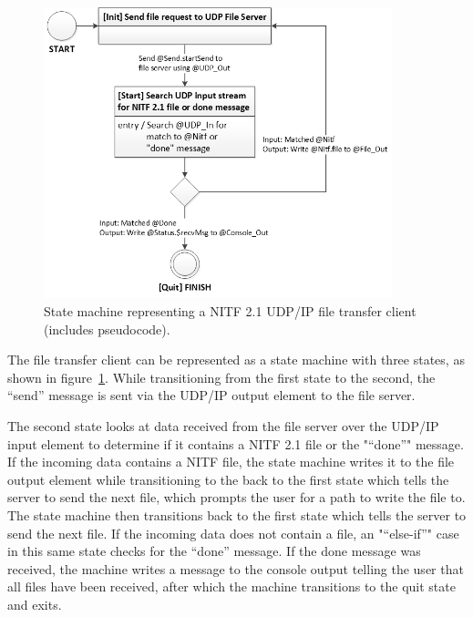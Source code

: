 \begin{figure}[htbp]
\centering
\includegraphics[width=0.9\textwidth]{figures/NitfFileClientUmlStateMachine.png}
\caption[State machine representing a NITF 2.1 UDP/IP file transfer client]{State machine representing a NITF 2.1 UDP/IP file transfer client (includes pseudocode).}
\label{fig:NitfFileClientUmlStateMachine}
\end{figure}

\indent
The file transfer client can be represented as a state machine with three states, as shown in figure~\ref{fig:NitfFileClientUmlStateMachine}.  While transitioning from the first state to the second, the “send” message is sent via the UDP/IP output element to the file server.

\indent
The second state looks at data received from the file server over the UDP/IP input element to determine if it contains a NITF 2.1 file or the "“done”" message.  If the incoming data contains a NITF file, the state machine writes it to the file output element while transitioning to the back to the first state which tells the server to send the next file, which prompts the user for a path to write the file to.  The state machine then transitions back to the first state which tells the server to send the next file.  If the incoming data does not contain a file, an "“else-if”" case in this same state checks for the “done” message.  If the done message was received, the machine writes a message to the console output telling the user that all files have been received, after which the machine transitions to the quit state and exits.

